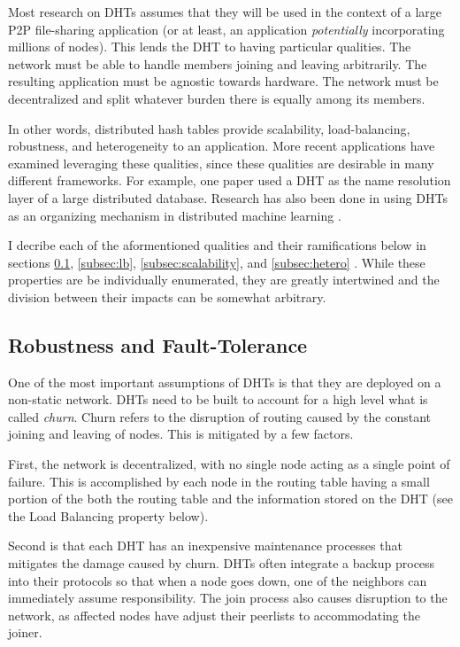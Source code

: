 \documentclass[10pt,letterpaper,twoside]{report}
\begin{document}
Most research on DHTs assumes that they will be used in the context of a large P2P file-sharing application  (or at least, an application \textit{potentially} incorporating millions of nodes).
This lends the DHT to having particular qualities.
The network must be able to handle members joining and leaving arbitrarily.
The resulting application must be agnostic towards hardware.
The network must be decentralized and split whatever burden there is equally among its members.

In other words, distributed hash tables provide scalability, load-balancing, robustness, and heterogeneity to an application.
More recent applications have examined leveraging these qualities, since these qualities are desirable in many different frameworks.
For example, one paper \cite{Mateescu2011440} used a DHT as the name resolution layer of a large distributed database.
Research has also been done in using DHTs as an organizing mechanism in distributed machine learning \cite{liparameter}. 


I decribe each of the aformentioned qualities and their ramifications below in sections \ref{subsec:ft}, \ref{subsec:lb}, \ref{subsec:scalability}, and \ref{subsec:hetero} .
While these properties are  be individually enumerated, they are greatly intertwined and the division between their impacts can be somewhat arbitrary.

\subsection{Robustness and Fault-Tolerance}
\label{subsec:ft}
One of the most important assumptions of DHTs is that they are deployed on a non-static network.
DHTs need to be built to account for a high level what is called \textit{churn}.  
Churn refers to the disruption of routing caused by the constant joining and leaving of nodes.
This is mitigated by a few factors.

First, the network is decentralized, with no single node acting as a single point of failure.
This is accomplished by each node in the routing table having a small portion of the both the routing table and the information stored on the DHT (see the Load Balancing property below).

Second is that each DHT has an inexpensive maintenance processes that mitigates the damage caused by churn.
DHTs often integrate a backup process into their protocols so that when a node goes down, one of the neighbors can immediately assume responsibility.
The join process also causes disruption to the network, as affected nodes have adjust their peerlists to accommodating the joiner. 
\end{document}

